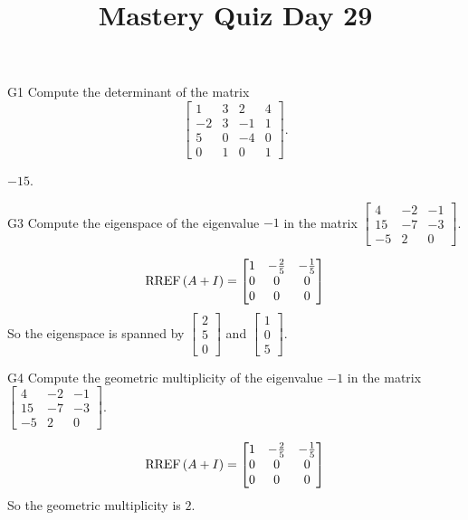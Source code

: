 \documentclass{sbgLAquiz}
\title{Mastery Quiz Day 29 }
\begin{document}
\begin{problem}{G1}
Compute the determinant of the matrix
\[
  \begin{bmatrix}
    1 & 3 & 2 & 4 \\
    -2 & 3 & -1 & 1 \\
    5 & 0 & -4 & 0 \\
    0 & 1 & 0 & 1
  \end{bmatrix}
.\]
\end{problem}
\begin{solution}
\(-15\).
\end{solution}

\begin{problem}{G3}
Compute the eigenspace of the eigenvalue $-1$ in the matrix $\begin{bmatrix} 4 & -2 & -1 \\ 15 & -7 & -3 \\ -5 & 2 & 0 \end{bmatrix}$. 
\end{problem}
\begin{solution}
$$\operatorname{RREF}\left(A+I\right) = \begin{bmatrix} 1 & - \frac{2}{5} & -\frac{1}{5} \\ 0 & 0 & 0 \\ 0 & 0 & 0 \end{bmatrix}$$
So the eigenspace is spanned by $\begin{bmatrix} 2 \\5 \\  0 \end{bmatrix}$ and $\begin{bmatrix} 1 \\ 0 \\ 5 \end{bmatrix}$.
\end{solution}


\begin{extract}\newpage\end{extract}
\begin{problem}{G4}
Compute the geometric multiplicity of the eigenvalue $-1$ in the matrix $\begin{bmatrix} 4 & -2 & -1 \\ 15 & -7 & -3 \\ -5 & 2 & 0 \end{bmatrix}$.  \end{problem}
\begin{solution}
$$\operatorname{RREF}\left(A+I\right) = \begin{bmatrix} 1 & - \frac{2}{5} & -\frac{1}{5} \\ 0 & 0 & 0 \\ 0 & 0 & 0 \end{bmatrix}$$
So the geometric multiplicity is $2$.
\end{solution}
\end{document}
